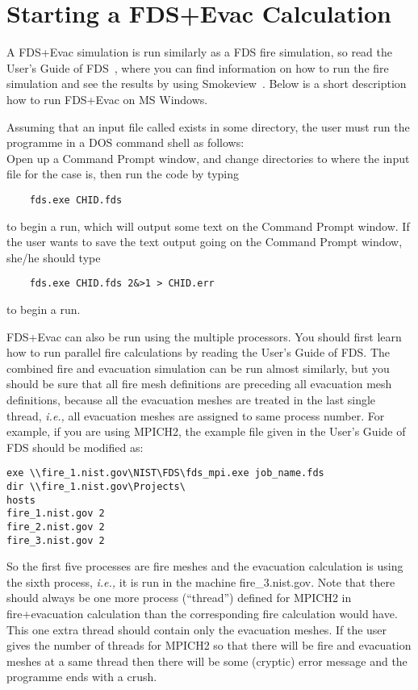 \documentclass[12pt,a4paper,final,twoside]{stylevk}
\begin{document}
\section{Starting a FDS+Evac Calculation} 

\noindent A FDS+Evac simulation is run similarly as a FDS fire
simulation, so read the User's Guide of FDS~\cite{FDS_UserGuide},
where you can find information on how to run the fire simulation and
see the results by using Smokeview~\cite{SV_UserGuide}.  Below is a
short description how to run FDS+Evac on MS Windows.


Assuming that an input file called  exists in some
directory, the user must run the programme in a DOS command shell as
follows:\\
Open up a Command Prompt window, and change directories to where the
input file for the case is, then run the code by typing
\begin{verbatim}
    fds.exe CHID.fds
\end{verbatim}
to begin a run, which will output some text on the Command Prompt
window.  If the user wants to save the text output going on the
Command Prompt window, she/he should type
\begin{verbatim}
    fds.exe CHID.fds 2&>1 > CHID.err
\end{verbatim}
to begin a run.

FDS+Evac can also be run using the multiple processors.  You should
first learn how to run parallel fire calculations by reading the
User's Guide of FDS.  The combined fire and evacuation simulation can
be run almost similarly, but you should be sure that all fire mesh
definitions are preceding all evacuation mesh definitions, because all
the evacuation meshes are treated in the last single thread,
\emph{i.e.,} all evacuation meshes are assigned to same process
number.  For example, if you are using MPICH2, the example
 file given in the User's Guide of FDS should be
modified as:
\begin{verbatim}
exe \\fire_1.nist.gov\NIST\FDS\fds_mpi.exe job_name.fds
dir \\fire_1.nist.gov\Projects\
hosts
fire_1.nist.gov 2
fire_2.nist.gov 2
fire_3.nist.gov 2
\end{verbatim}
So the first five processes are fire meshes and the evacuation
calculation is using the sixth process, \emph{i.e.,} it is run in the
machine fire\_3.nist.gov.  Note that there should always be one more
process (``thread'') defined for MPICH2 in fire+evacuation calculation
than the corresponding fire calculation would have.  This one extra
thread should contain only the evacuation meshes.  If the user gives
the number of threads for MPICH2 so that there will be fire and
evacuation meshes at a same thread then there will be some (cryptic)
error message and the programme ends with a crush.
\end{document}

